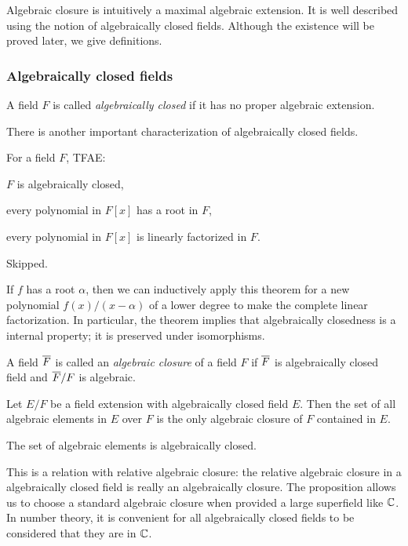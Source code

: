 \documentclass{../exp}
\begin{document}
Algebraic closure is intuitively a maximal algebraic extension.
It is well described using the notion of algebraically closed fields.
Although the existence will be proved later, we give definitions.

\subsubsection{Algebraically closed fields}
\begin{defn}
A field $F$ is called \emph{algebraically closed} if it has no proper algebraic extension.
\end{defn}

There is another important characterization of algebraically closed fields.

\begin{prop}
For a field $F$, TFAE:
\begin{cond}
\item $F$ is algebraically closed,
\item every polynomial in $F[x]$ has a root in $F$,
\item every polynomial in $F[x]$ is linearly factorized in $F$.
\end{cond}
\end{prop}
\begin{pf}
Skipped.
\end{pf}

If $f$ has a root $\alpha$, then we can inductively apply this theorem for a new polynomial $f(x)/(x-\alpha)$ of a lower degree to make the complete linear factorization.
In particular, the theorem implies that algebraically closedness is a internal property; it is preserved under isomorphisms.

\begin{defn}
A field $\overline F$ is called an \emph{algebraic closure} of a field $F$ if $\overline F$ is algebraically closed field and $\overline F/F$ is algebraic.
\end{defn}


\begin{prop}
Let $E/F$ be a field extension with algebraically closed field $E$.
Then the set of all algebraic elements in $E$ over $F$ is the only algebraic closure of $F$ contained in $E$.
\end{prop}
\begin{pf}
The set of algebraic elements is algebraically closed.
\end{pf}

This is a relation with relative algebraic closure: the relative algebraic closure in a algebraically closed field is really an algebraically closure.
The proposition allows us to choose a standard algebraic closure when provided a large superfield like $\mathbb{C}$.
In number theory, it is convenient for all algebraically closed fields to be considered that they are in $\mathbb{C}$. 
\end{document}
